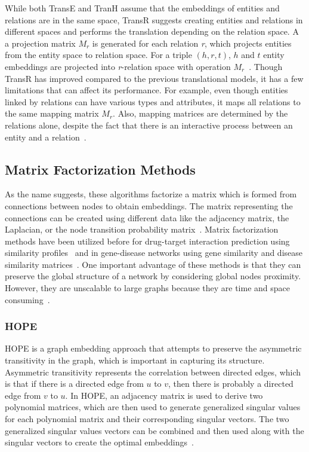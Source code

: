While both TransE and TranH assume that the embeddings of entities and relations are in the same space, TransR suggests creating entities and relations in different spaces and performs the translation depending on the relation space.
A a projection matrix $M_{r}$ is generated for each relation \textit{r}, which projects entities from the entity space to relation space.
For a triple $(h, r, t)$, $h$ and $t$ entity embeddings are projected into \textit{r}-relation space with operation $M_{r}$~\cite{lin_learning_2015}.
Though TransR has improved compared to the previous translational models, it has a few limitations that can affect its performance.
For example, even though entities linked by relations can have various types and attributes, it maps all relations to the same mapping matrix $M_{r}$.
Also, mapping matrices are determined by the relations alone, despite the fact that there is an interactive process between an entity and a relation~\cite{ji_knowledge_2015}.

\subsection{Matrix Factorization Methods}

As the name suggests, these algorithms factorize a matrix which is formed from connections between nodes to obtain embeddings.
The matrix representing the connections can be created using different data like the adjacency matrix, the Laplacian, or the node transition probability matrix~\cite{goyal_graph_2018}.
Matrix factorization methods have been utilized before for drug-target interaction prediction using similarity profiles~\cite{ezzat_drug-target_2017, yamanishi_dinies:_2014} and in gene-disease networks using gene similarity and disease similarity matrices~\cite{zeng_probability-based_2017}.
One important advantage of these methods is that they can preserve the global structure of a network by considering global nodes proximity.
However, they are unscalable to large graphs because they are time and space consuming~\cite{cai_comprehensive_2017}.

\subsubsection{HOPE}

\ac{HOPE} is a graph embedding approach that attempts to preserve the asymmetric transitivity in the graph, which is important in capturing its structure.
Asymmetric transitivity represents the correlation between directed edges, which is that if there is a directed edge from $u$ to $v$, then there is probably a directed edge from $v$ to $u$.
In \ac{HOPE}, an adjacency matrix is used to derive two polynomial matrices, which are then used to generate generalized singular values for each polynomial matrix and their corresponding singular vectors.
The two generalized singular values vectors can be combined and then used along with the singular vectors to create the optimal embeddings~\cite{ou_asymmetric_2016}.

